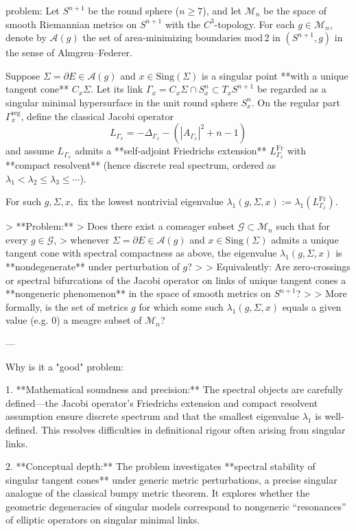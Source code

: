 problem:  
Let \(S^{n+1}\) be the round sphere (\(n \ge 7\)), and let \(\mathcal{M}_n\) be the space of smooth Riemannian metrics on \(S^{n+1}\) with the \(C^3\)-topology.  
For each \(g \in \mathcal{M}_n\), denote by \(\mathcal{A}(g)\) the set of area‑minimizing boundaries mod 2 in \((S^{n+1}, g)\) in the sense of Almgren–Federer.

Suppose \(\Sigma = \partial E \in \mathcal{A}(g)\) and \(x \in \mathrm{Sing}(\Sigma)\) is a singular point **with a unique tangent cone** \(C_x\Sigma\).  
Let its link \(\Gamma_x = C_x\Sigma \cap S_x^n \subset T_xS^{n+1}\) be regarded as a singular minimal hypersurface in the unit round sphere \(S_x^n\).  
On the regular part \(\Gamma_x^{\mathrm{reg}}\), define the classical Jacobi operator
\[
L_{\Gamma_x} = -\Delta_{\Gamma_x} - (|A_{\Gamma_x}|^2 + n - 1)
\]
and assume \(L_{\Gamma_x}\) admits a **self‑adjoint Friedrichs extension** \(L_{\Gamma_x}^{\mathrm{Fr}}\) with **compact resolvent** (hence discrete real spectrum, ordered as \( \lambda_1 < \lambda_2 \le \lambda_3 \le \cdots \)).  

For such \(g, \Sigma, x,\) fix the lowest nontrivial eigenvalue \(\lambda_1(g, \Sigma, x) := \lambda_1(L_{\Gamma_x}^{\mathrm{Fr}})\).  

> **Problem:**  
> Does there exist a comeager subset \(\mathcal{G} \subset \mathcal{M}_n\) such that for every \(g \in \mathcal{G}\),
> whenever \(\Sigma = \partial E \in \mathcal{A}(g)\) and \(x \in \mathrm{Sing}(\Sigma)\) admits a unique tangent cone with spectral compactness as above, the eigenvalue \(\lambda_1(g, \Sigma, x)\) is **nondegenerate** under perturbation of \(g\)?  
>  
> Equivalently: Are zero‑crossings or spectral bifurcations of the Jacobi operator on links of unique tangent cones a **nongeneric phenomenon** in the space of smooth metrics on \(S^{n+1}\)?  
>  
> More formally, is the set of metrics \(g\) for which some such \(\lambda_1(g, \Sigma, x)\) equals a given value (e.g. 0) a meagre subset of \(\mathcal{M}_n\)?

---

Why is it a "good" problem:  

1. **Mathematical soundness and precision:**  
   The spectral objects are carefully defined—the Jacobi operator’s Friedrichs extension and compact resolvent assumption ensure discrete spectrum and that the smallest eigenvalue \(\lambda_1\) is well-defined. This resolves difficulties in definitional rigour often arising from singular links.

2. **Conceptual depth:**  
   The problem investigates **spectral stability of singular tangent cones** under generic metric perturbations, a precise singular analogue of the classical bumpy metric theorem. It explores whether the geometric degeneracies of singular models correspond to nongeneric “resonances” of elliptic operators on singular minimal links.

